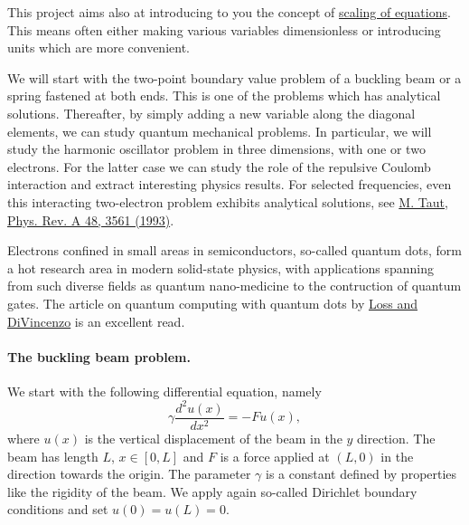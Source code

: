 \documentclass[%
oneside,                 %
final,                   %
10pt]{article}
\begin{document}
This project aims also at introducing to you the concept of \href{{http://www.springer.com/us/book/9783319327259}}{scaling of equations}. This means often either making various variables dimensionless or introducing units which are more convenient. 

We will start with the two-point boundary value problem of a buckling beam or a spring fastened at both ends. This is one of the problems which has analytical solutions. Thereafter, by simply adding a new variable along the diagonal elements, we can study quantum mechanical problems. In particular, we will study the harmonic oscillator problem in three dimensions, with one or two electrons. For the latter case we can study the role of the repulsive Coulomb interaction and extract interesting physics results. For selected frequencies, even this interacting two-electron problem exhibits analytical solutions, see \href{{http://prola.aps.org/abstract/PRA/v48/i5/p3561_1}}{M. Taut, Phys. Rev. A 48, 3561 (1993)}.

Electrons confined in small areas in semiconductors, so-called quantum
dots, form a hot research area in modern solid-state physics, with
applications spanning from such diverse fields as quantum
nano-medicine to the contruction of quantum gates. 
The article on quantum computing with quantum dots by \href{{http://journals.aps.org/pra/abstract/10.1103/PhysRevA.57.120}}{Loss and DiVincenzo} is an excellent read.



\paragraph{The buckling beam problem.}
We start with the following differential equation, namely 
\[
\gamma \frac{d^2 u(x)}{dx^2} = -F u(x),
\]
where $u(x)$ is the vertical displacement of the beam in the $y$ direction. 
The beam has length $L$, $x\in [0,L]$ and $F$ is a force applied at $(L,0)$ in the direction towards the origin. 
The parameter $\gamma$ is a constant defined by properties like the rigidity of the beam. 
We apply again so-called Dirichlet boundary conditions and set $u(0)=u(L)=0$.
\end{document}
